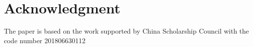 \section{Acknowledgment}
The paper is based on the work supported by China Scholarship Council with
the code number 201806630112
